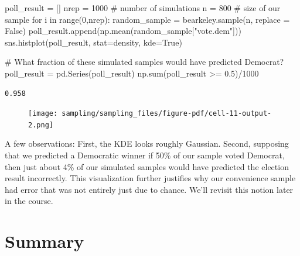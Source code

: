 \documentclass[
  letterpaper,
  DIV=11,
  numbers=noendperiod]{scrreprt}
\newenvironment{Shaded}{\begin{snugshade}}{\end{snugshade}}
\newcommand{\BuiltInTok}[1]{\textcolor[rgb]{0.00,0.23,0.31}{#1}}
\newcommand{\CommentTok}[1]{\textcolor[rgb]{0.37,0.37,0.37}{#1}}
\newcommand{\ControlFlowTok}[1]{\textcolor[rgb]{0.00,0.23,0.31}{#1}}
\newcommand{\DecValTok}[1]{\textcolor[rgb]{0.68,0.00,0.00}{#1}}
\newcommand{\FloatTok}[1]{\textcolor[rgb]{0.68,0.00,0.00}{#1}}
\newcommand{\KeywordTok}[1]{\textcolor[rgb]{0.00,0.23,0.31}{#1}}
\newcommand{\NormalTok}[1]{\textcolor[rgb]{0.00,0.23,0.31}{#1}}
\newcommand{\OperatorTok}[1]{\textcolor[rgb]{0.37,0.37,0.37}{#1}}
\newcommand{\StringTok}[1]{\textcolor[rgb]{0.13,0.47,0.30}{#1}}
\newcommand{\VariableTok}[1]{\textcolor[rgb]{0.07,0.07,0.07}{#1}}
\begin{document}
\begin{Shaded}
\begin{Highlighting}[]
\NormalTok{poll\_result }\OperatorTok{=}\NormalTok{ []}
\NormalTok{nrep }\OperatorTok{=} \DecValTok{1000}   \CommentTok{\# number of simulations}
\NormalTok{n }\OperatorTok{=} \DecValTok{800}       \CommentTok{\# size of our sample}
\ControlFlowTok{for}\NormalTok{ i }\KeywordTok{in} \BuiltInTok{range}\NormalTok{(}\DecValTok{0}\NormalTok{,nrep):}
\NormalTok{    random\_sample }\OperatorTok{=}\NormalTok{ bearkeley.sample(n, replace }\OperatorTok{=} \VariableTok{False}\NormalTok{)}
\NormalTok{    poll\_result.append(np.mean(random\_sample[}\StringTok{"vote.dem"}\NormalTok{]))}
\NormalTok{sns.histplot(poll\_result, stat}\OperatorTok{=}\StringTok{\textquotesingle{}density\textquotesingle{}}\NormalTok{, kde}\OperatorTok{=}\VariableTok{True}\NormalTok{)}

\CommentTok{\# What fraction of these simulated samples would have predicted Democrat?}
\NormalTok{poll\_result }\OperatorTok{=}\NormalTok{ pd.Series(poll\_result)}
\NormalTok{np.}\BuiltInTok{sum}\NormalTok{(poll\_result }\OperatorTok{\textgreater{}=} \FloatTok{0.5}\NormalTok{)}\OperatorTok{/}\DecValTok{1000}
\end{Highlighting}
\end{Shaded}

\begin{verbatim}
0.958
\end{verbatim}

\begin{figure}[H]

{\centering \texttt{[image: sampling/sampling\_files/figure-pdf/cell-11-output-2.png]}

}

\end{figure}

A few observations: First, the KDE looks roughly Gaussian. Second,
supposing that we predicted a Democratic winner if 50\% of our sample
voted Democrat, then just about 4\% of our simulated samples would have
predicted the election result incorrectly. This visualization further
justifies why our convenience sample had error that was not entirely
just due to chance. We'll revisit this notion later in the course.

\hypertarget{summary}{%
\section{Summary}\label{summary}}
\end{document}
